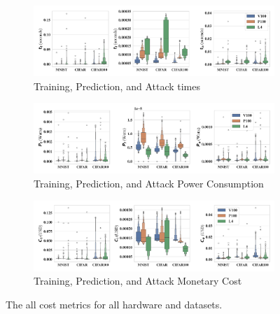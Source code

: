 \documentclass[conference]{IEEEtran}
\begin{document}
\begin{figure}[h]
    \centering
    \begin{subfigure}[b]{.8\textwidth}
        \includegraphics[width=\linewidth,clip]{plots/combined/time.pdf}
        \caption{Training, Prediction, and Attack times}
        \label{fig:time}
    \end{subfigure}
    \begin{subfigure}[b]{.8\textwidth}
        \includegraphics[width=\linewidth,clip]{plots/combined/power.pdf}
        \caption{Training, Prediction, and Attack Power Consumption}
        \label{fig:power}
    \end{subfigure}
    \begin{subfigure}[b]{.8\textwidth}
        \includegraphics[width=\linewidth,clip]{plots/combined/cost.pdf}
        \caption{Training, Prediction, and Attack Monetary Cost}
        \label{fig:cost}
    \end{subfigure}
    \caption{The all cost metrics for all hardware and datasets.}
\end{figure}
\end{document}
